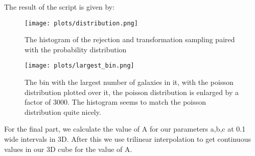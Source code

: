 The result of the script is given by:



\begin{figure}[h]
   \centering
   \texttt{[image: plots/distribution.png]}
      \caption{The histogram of the rejection and transformation sampling paired with the probability distribution}
\end{figure}

\begin{figure}[h]
   \centering
   \texttt{[image: plots/largest\_bin.png]}
      \caption{The bin with the largest number of galaxies in it, with the poisson distribution plotted over it, the poisson distribution is enlarged by a factor of 3000. The histogram seems to match the poisson distribution quite nicely. }
\end{figure}

For the final part, we calculate the value of A for our parameters a,b,c at 0.1 wide intervals in 3D. After this we use trilinear interpolation to get continuous values in our 3D cube for the value of A.
